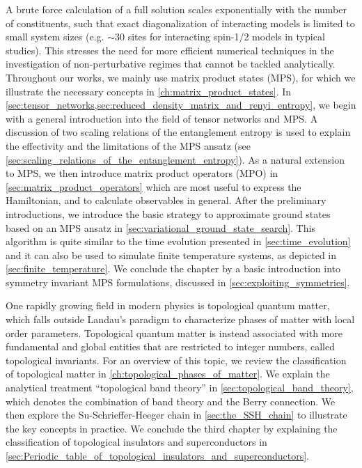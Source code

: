 A brute force calculation of a full solution scales exponentially with the number of constituents, such that exact diagonalization of interacting models is limited to small system sizes (e.g. $\sim 30$ sites for interacting spin-1/2 models in typical studies).
This stresses the need for more efficient numerical techniques in the investigation of non-perturbative regimes that cannot be tackled analytically.
Throughout our works, we mainly use matrix product states (MPS), for which we illustrate the necessary concepts in \cref{ch:matrix_product_states}.
In \cref{sec:tensor_networks,sec:reduced_density_matrix_and_renyi_entropy}, we begin with a general introduction into the field of tensor networks and MPS.
A discussion of two scaling relations of the entanglement entropy is used to explain the effectivity and the limitations of the MPS ansatz (see \cref{sec:scaling_relations_of_the_entanglement_entropy}).
As a natural extension to MPS, we then introduce matrix product operators (MPO) in \cref{sec:matrix_product_operators} which are most useful to express the Hamiltonian, and to calculate observables in general.
After the preliminary introductions, we introduce the basic strategy to approximate ground states based on an MPS ansatz in \cref{sec:variational_ground_state_search}.
This algorithm is quite similar to the time evolution presented in \cref{sec:time_evolution} and it can also be used to simulate finite temperature systems, as depicted in \cref{sec:finite_temperature}.
We conclude the chapter by a basic introduction into symmetry invariant MPS formulations, discussed in \cref{sec:exploiting_symmetries}.

One rapidly growing field in modern physics is topological quantum matter, which falls outside Landau's paradigm to characterize phases of matter with local order parameters.
Topological quantum matter is instead associated with more fundamental and global entities that are restricted to integer numbers, called topological invariants.
For an overview of this topic, we review the classification of topological matter in \cref{ch:topological_phases_of_matter}.
We explain the analytical treatment ``topological band theory'' in \cref{sec:topological_band_theory}, which denotes the combination of band theory and the Berry connection.
We then explore the Su-Schrieffer-Heeger chain in \cref{sec:the_SSH_chain} to illustrate the key concepts in practice.
We conclude the third chapter by explaining the classification of topological insulators and superconductors in \cref{sec:Periodic_table_of_topological_insulators_and_superconductors}.

